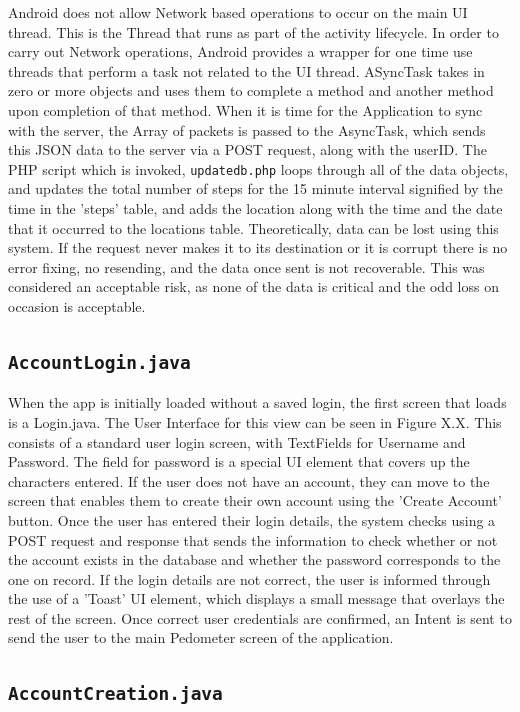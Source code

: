 \documentclass{l4proj}
\begin{document}
Android does not allow Network based operations to occur on the main UI thread. This is the Thread that runs as part of the activity lifecycle. In order to carry out Network operations, Android provides a wrapper for one time use threads that perform a task not related to the UI thread. ASyncTask takes in zero or more objects and uses them to complete a method and another method upon completion of that method. When it is time for the Application to sync with the server, the Array of packets is passed to the AsyncTask, which sends this JSON data to the server via a POST request, along with the userID. The PHP script which is invoked, \texttt{updatedb.php} loops through all of the data objects, and updates the total number of steps for the 15 minute interval signified by the time in the 'steps' table, and adds the location along with the time and the date that it occurred to the locations table. Theoretically, data can be lost using this system. If the request never makes it to its destination or it is corrupt there is no error fixing, no resending, and the data once sent is not recoverable. This was considered an acceptable risk, as none of the data is critical and the odd loss on occasion is acceptable.

\subsection{\texttt{AccountLogin.java}}

When the app is initially loaded without a saved login, the first screen that loads is a Login.java. The User Interface for this view can be seen in Figure X.X. This consists of a standard user login screen, with TextFields for Username and Password. The field for password is a special UI element that covers up the characters entered. If the user does not have an account, they can move to the screen that enables them to create their own account using the 'Create Account' button. Once the user has entered their login details, the system checks using a POST request and response that sends the information to check whether or not the account exists in the database and whether the password corresponds to the one on record. If the login details are not correct, the user is informed through the use of a 'Toast' UI element, which displays a small message that overlays the rest of the screen. Once correct user credentials are confirmed, an Intent is sent to send the user to the main Pedometer screen of the application.

\subsection{\texttt{AccountCreation.java}}
\end{document}
